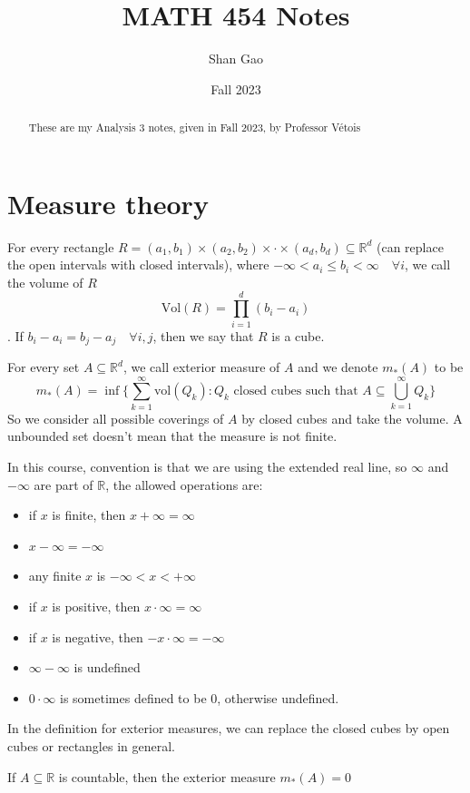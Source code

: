 \documentclass{tufte-handout}
\title{MATH 454 Notes}
\author{Shan Gao}
\date{Fall 2023}
\begin{document}
	\maketitle
	\begin{abstract}
		These are my Analysis 3 notes, given in Fall 2023, by Professor Vétois 
	\end{abstract}
	\section{Measure theory}
\begin{definition}[Rectangle]
	For every rectangle $R = (a_1,b_1) \times (a_2,b_2) \times \cdot \times (a_d,b_d) \subseteq \mathbb{R}^d$ (can replace the open intervals with closed intervals), where $-\infty < a_i \leq b_i < \infty \quad \forall i$, we call the volume of $R$ $$\text{Vol}(R) = \prod_{i = 1}^d (b_i - a_i)$$. If $b_i - a_i = b_j - a_j \quad \forall i,j$, then we say that $R$ is a cube.
\end{definition}
\begin{definition}
	For every set $A \subseteq \mathbb{R}^d$, we call exterior measure of $A$ and we denote $m_*(A)$ to be
	$$
	m_* (A) = \inf \{\sum_{k =1}^\infty \text{vol}(Q_k) \colon Q_k \text{ closed cubes such that } A \subseteq \bigcup_{k=1}^\infty Q_k\} 
	$$
	So we consider all possible coverings of $A$ by closed cubes and take the volume. A unbounded set doesn't mean that the measure is not finite. 
\end{definition}
In this course, convention is that we are using the extended real line, so $\infty$ and $-\infty$ are part of $\mathbb{R}$, the allowed operations are:
\begin{itemize}
	\item if $x$ is finite, then $x + \infty = \infty$
	\item $x -\infty = -\infty$
	\item any finite $x$ is $-\infty < x < +\infty$
	\item if $x$ is positive, then $x \cdot \infty = \infty$
	\item if $x$ is negative, then $-x \cdot \infty = -\infty$
	\item $\infty - \infty$ is undefined
	\item $0 \cdot \infty$ is sometimes defined to be $0$, otherwise undefined.
\end{itemize}
In the definition for exterior measures, we can replace the closed cubes by open cubes or rectangles in general. 
\begin{proposition}
	If $A \subseteq \mathbb{R}$ is countable, then the exterior measure $m_* (A) =0$
\end{proposition}
\end{document}
